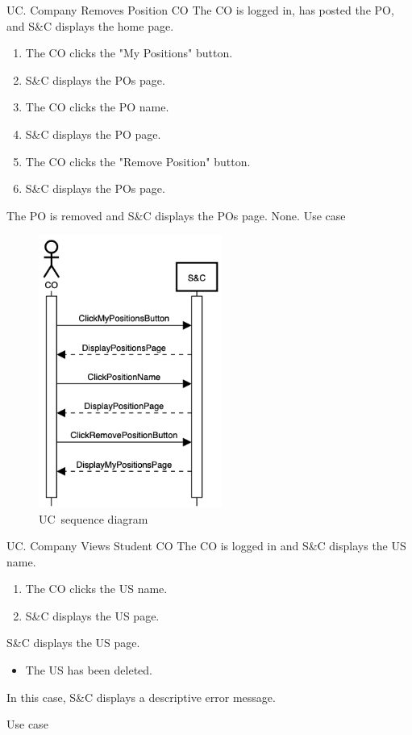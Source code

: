 
\clearpage

\begin{usecase}
    {UC\theuc. Company Removes Position}
    {CO}
    {The CO is logged in, has posted the PO, and S\&C displays the home page.}
    {\begin{enumerate}[leftmargin=*]
        \item The CO clicks the "My Positions" button.
        \item S\&C displays the POs page.
        \item The CO clicks the PO name.
        \item S\&C displays the PO page.
        \item The CO clicks the "Remove Position" button.
        \item S\&C displays the POs page.
    \end{enumerate}}
    {The PO is removed and S\&C displays the POs page.}
    {None.}
    {Use case \theuc}
\end{usecase}

\begin{figure}[h]
    \centering
    \includegraphics[width=6cm]{images/sequence-diagrams/company-removes-position.png}
    \caption{UC\theuc\ sequence diagram}
\end{figure}


\clearpage
\begin{usecase}
    {UC\theuc. Company Views Student}
    {CO}
    {The CO is logged in and S\&C displays the US name.}
    {\begin{enumerate}[leftmargin=*]
        \item The CO clicks the US name.
        \item S\&C displays the US page.
    \end{enumerate}}
    {S\&C displays the US page.}
    {\begin{itemize}[leftmargin=*, label=\tiny\textbullet]
        \item The US has been deleted.
    \end{itemize}
    In this case, S\&C displays a descriptive error message.}
    {Use case \theuc}
\end{usecase}

